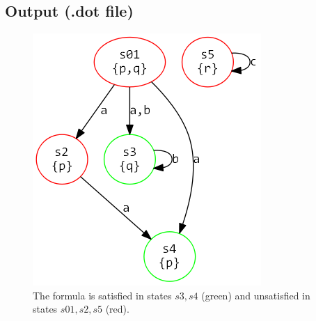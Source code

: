 \documentclass[12pt,a4paper]{article}
\begin{document}
\subsection*{Output (.dot file)}

\begin{figure}[H]
\center
\includegraphics[scale=0.4]{example2.png}

\caption{The formula is satisfied in states $s3, s4$ (green) and unsatisfied in states $s01, s2, s5$ (red). }
\end{figure}






\end{document}
